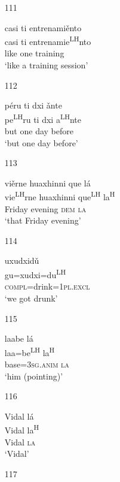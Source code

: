 \begin{itemize}
\item[111]
 
\glll   casi ti entrenami\v{e}nto\\
  casi ti entrenamie\textsuperscript{LH}nto\\
  like one training\\
\glt `like a training session'
 

\item[112]

\glll p\'{e}ru ti dxi \v{a}nte \\
pe\textsuperscript{LH}ru ti dxi a\textsuperscript{LH}nte \\
but one day before \\
\glt  `but one day before'



\item[113]

\glll vi\v{e}rne huaxhinni que l\'{a} \\
vie\textsuperscript{LH}rne huaxhinni que\textsuperscript{LH} la\textsuperscript{H} \\
Friday evening \textsc{dem} \textsc{la} \\
\glt  `that Friday evening'



\item[114]

\glll uxudxid\v{u} \\
gu=xudxi=du\textsuperscript{LH} \\
\textsc{compl}=drink=1\textsc{pl.excl} \\
\glt  `we got drunk'



\item[115]

\glll laabe l\'{a} \\
laa=be\textsuperscript{LH} la\textsuperscript{H} \\
base=3\textsc{sg.anim} \textsc{la} \\
\glt  `him (pointing)'



\item[116]

\glll Vidal l\'{a} \\
Vidal la\textsuperscript{H} \\
Vidal \textsc{la} \\
\glt  `Vidal'



\item[117]


\end{itemize}
